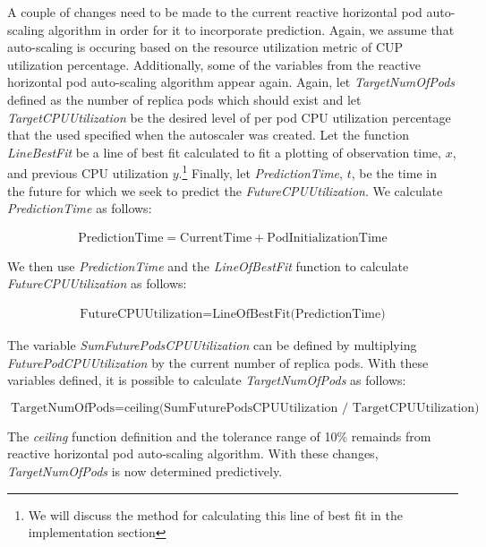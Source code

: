 A couple of changes need to be made to the current reactive horizontal pod
auto-scaling algorithm in order for it to incorporate prediction. Again, we
assume that auto-scaling is occuring based on the resource utilization metric of
CUP utilization percentage. Additionally, some of the variables from the
reactive horizontal pod auto-scaling algorithm appear again. Again, let
\textit{TargetNumOfPods} defined as the number of replica pods which should
exist and let \textit{TargetCPUUtilization} be the desired level of per pod CPU
utilization percentage that the used specified when the autoscaler was created.
Let the function \textit{LineBestFit} be a line of best fit calculated
to fit a plotting of observation time, $x$, and previous CPU utilization
$y$.\footnote{We will discuss the method for calculating this line of best fit
in the implementation section} Finally, let
\textit{PredictionTime}, $t$, be the time in the future for
which we seek to predict the \textit{FutureCPUUtilization}. We calculate
\textit{PredictionTime} as follows:

\begin{align*}
  \mbox{PredictionTime} = \mbox{CurrentTime} + \mbox{{PodInitializationTime}}
\end{align*}

We then use \textit{PredictionTime} and the \textit{LineOfBestFit} function to
calculate \textit{FutureCPUUtilization} as follows:

\begin{align*}
  \mbox{FutureCPUUtilization} = \mbox{LineOfBestFit(PredictionTime)}
\end{align*}

The variable \textit{SumFuturePodsCPUUtilization} can be defined by multiplying
\textit{FuturePodCPUUtilization} by the current number of replica pods.
With these variables defined, it is possible to calculate
\textit{TargetNumOfPods} as follows:

\[ \mbox{TargetNumOfPods} = \mbox{ceiling(SumFuturePodsCPUUtilization /
TargetCPUUtilization)} \]

The \textit{ceiling} function definition and the tolerance range of 10\% remainds from
reactive horizontal pod auto-scaling algorithm. With these changes,
\textit{TargetNumOfPods} is now determined predictively.
